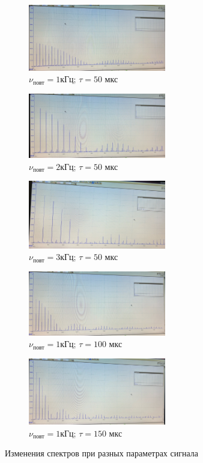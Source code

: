 \begin{figure}[h!]
    \centering
    \begin{subfigure}[b]{0.3\linewidth}
        \centering
        \includegraphics[width=6cm]{./images/nu_1_t_50.jpg}
        \caption{$\nu_{\text{повт}} = 1$кГц; $\tau = 50$ мкс}
    \end{subfigure}
    \hfill
    \begin{subfigure}[b]{0.3\linewidth}
        \centering
        \includegraphics[width=6cm]{./images/nu_2_t_50.jpg}
        \caption{$\nu_{\text{повт}} = 2$кГц; $\tau = 50$ мкс}
    \end{subfigure}
    \hfill
    \begin{subfigure}{0.3\linewidth}
        \centering
        \includegraphics[width=6cm]{./images/nu_3_t_50.jpg}
        \caption{$\nu_{\text{повт}} = 3$кГц; $\tau = 50$ мкс}
    \end{subfigure}
    \vfill
    \begin{subfigure}{0.35\linewidth}
        \centering
        \includegraphics[width=6cm]{./images/nu_1_t_100.jpg}
    \caption{$\nu_{\text{повт}} = 1$кГц; $\tau = 100$ мкс}
    \end{subfigure}
    \begin{subfigure}{0.35\linewidth}
        \centering
        \includegraphics[width=6cm]{./images/nu_1_t_150.jpg}
    \caption{$\nu_{\text{повт}} = 1$кГц; $\tau = 150$ мкс}
    \end{subfigure}
    \caption{Изменения спектров при разных параметрах сигнала}
\end{figure}

